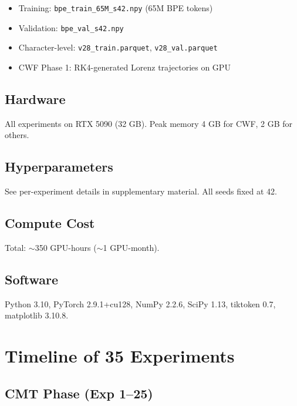 \documentclass{article}
\begin{document}
\begin{itemize}
    \item Training: \texttt{bpe\_train\_65M\_s42.npy} (65M BPE tokens)
    \item Validation: \texttt{bpe\_val\_s42.npy}
    \item Character-level: \texttt{v28\_train.parquet}, \texttt{v28\_val.parquet}
    \item CWF Phase 1: RK4-generated Lorenz trajectories on GPU
\end{itemize}

\subsection{Hardware}

All experiments on RTX 5090 (32 GB). Peak memory 4 GB for CWF, 2 GB for others.

\subsection{Hyperparameters}

See per-experiment details in supplementary material. All seeds fixed at 42.

\subsection{Compute Cost}

Total: $\sim$350 GPU-hours ($\sim$1 GPU-month).

\subsection{Software}

Python 3.10, PyTorch 2.9.1+cu128, NumPy 2.2.6, SciPy 1.13, tiktoken 0.7, matplotlib 3.10.8.


\section{Timeline of 35 Experiments}

\subsection{CMT Phase (Exp 1--25)}
\end{document}
